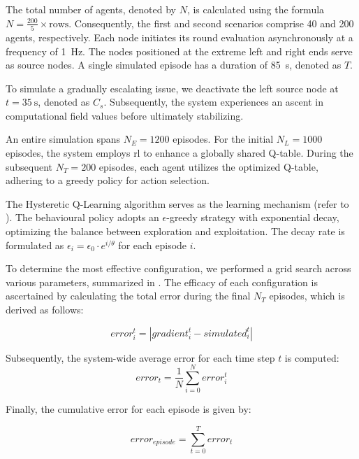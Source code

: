 The total number of agents, denoted by $N$, 
 is calculated using the formula \(N = \frac{200}{5} \times \text{rows}\). Consequently, the first and second scenarios comprise 40 and 200 agents, respectively. 
 Each node initiates its round evaluation asynchronously at a frequency of \SI{1}{\hertz}. 
 The nodes positioned at the extreme left and right ends serve as source nodes. 
 A single simulated episode has a duration of \SI{85}{\second}, denoted as $T$.

To simulate a gradually escalating issue, 
 we deactivate the left source node at \(t = \SI{35}{\second}\), 
 denoted as $C_s$. Subsequently, the system experiences an ascent in computational field values before ultimately stabilizing.

An entire simulation spans $N_E = 1200$ episodes. 
 For the initial $N_L = 1000$ episodes, the system employs \ac{rl} to enhance a globally shared Q-table. 
 During the subsequent $N_T = 200$ episodes, 
 each agent utilizes the optimized Q-table, adhering to a greedy policy for action selection.

The Hysteretic Q-Learning algorithm serves as the learning mechanism (refer to ). 
 The behavioural policy adopts an $\epsilon$-greedy strategy with exponential decay, optimizing the balance between exploration and exploitation. 
 The decay rate is formulated as \(\epsilon_i = \epsilon_0 \cdot e^{{i} / \theta}\) for each episode $i$.

To determine the most effective configuration, 
 we performed a grid search across various parameters, summarized in . 
 The efficacy of each configuration is ascertained by calculating the total error during the final $N_T$ episodes, which is derived as follows:

\begin{equation}
\label{eq:individual_error}
error_i^{t} = |gradient_i^{t} - simulated_i^t|
\end{equation}

Subsequently, the system-wide average error for each time step $t$ is computed:
\begin{equation}
\label{eq:average_error}
error_{t} = \frac{1}{N}\sum_{i = 0}^N error_i^t
\end{equation}

Finally, the cumulative error for each episode is given by:

\begin{equation}
\label{eq:episode_error}
error_{episode} = \sum_{t = 0}^T error_{t}
\end{equation}

